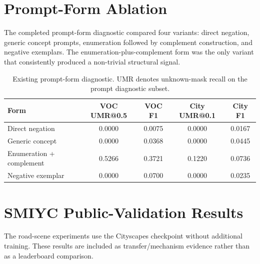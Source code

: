 \documentclass[11pt]{article}
\begin{document}
\section{Prompt-Form Ablation}
The completed prompt-form diagnostic compared four variants: direct negation, generic concept prompts, enumeration followed by complement construction, and negative exemplars. The enumeration-plus-complement form was the only variant that consistently produced a non-trivial structural signal.
\begin{table}[h]
\centering
\caption{Existing prompt-form diagnostic. UMR denotes unknown-mask recall on the prompt diagnostic subset.}
\footnotesize
\begin{tabular}{lcccc}
\toprule
Form & VOC UMR@0.5 & VOC F1 & City UMR@0.1 & City F1 \\
\midrule
Direct negation & 0.0000 & 0.0075 & 0.0000 & 0.0167 \\
Generic concept & 0.0000 & 0.0368 & 0.0000 & 0.0445 \\
Enumeration + complement & 0.5266 & 0.3721 & 0.1220 & 0.0736 \\
Negative exemplar & 0.0000 & 0.0700 & 0.0000 & 0.0235 \\
\bottomrule
\end{tabular}
\end{table}

\section{SMIYC Public-Validation Results}
The road-scene experiments use the Cityscapes checkpoint without additional training. These results are included as transfer/mechanism evidence rather than as a leaderboard comparison.
\begin{table}[t]
\centering
\caption{Existing SMIYC public-validation results.}
\footnotesize
{}%
\end{table}
\end{document}
